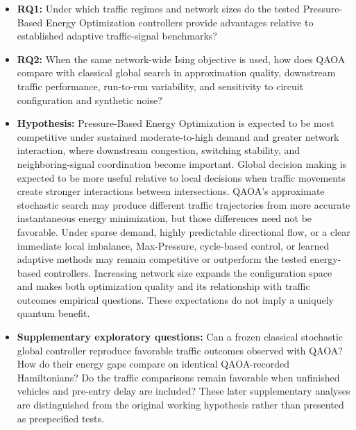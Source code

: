 \begin{itemize}
\item \textbf{RQ1:} Under which traffic regimes and network sizes do the tested Pressure-Based Energy Optimization controllers provide advantages relative to established adaptive traffic-signal benchmarks?

\item \textbf{RQ2:} When the same network-wide Ising objective is used, how does QAOA compare with classical global search in approximation quality, downstream traffic performance, run-to-run variability, and sensitivity to circuit configuration and synthetic noise?

\item \textbf{Hypothesis:} Pressure-Based Energy Optimization is expected to be most competitive under sustained moderate-to-high demand and greater network interaction, where downstream congestion, switching stability, and neighboring-signal coordination become important. Global decision making is expected to be more useful relative to local decisions when traffic movements create stronger interactions between intersections. QAOA's approximate stochastic search may produce different traffic trajectories from more accurate instantaneous energy minimization, but those differences need not be favorable. Under sparse demand, highly predictable directional flow, or a clear immediate local imbalance, Max-Pressure, cycle-based control, or learned adaptive methods may remain competitive or outperform the tested energy-based controllers. Increasing network size expands the configuration space and makes both optimization quality and its relationship with traffic outcomes empirical questions. These expectations do not imply a uniquely quantum benefit.

\item \textbf{Supplementary exploratory questions:} Can a frozen classical stochastic global controller reproduce favorable traffic outcomes observed with QAOA? How do their energy gaps compare on identical QAOA-recorded Hamiltonians? Do the traffic comparisons remain favorable when unfinished vehicles and pre-entry delay are included? These later supplementary analyses are distinguished from the original working hypothesis rather than presented as prespecified tests.


\end{itemize}
